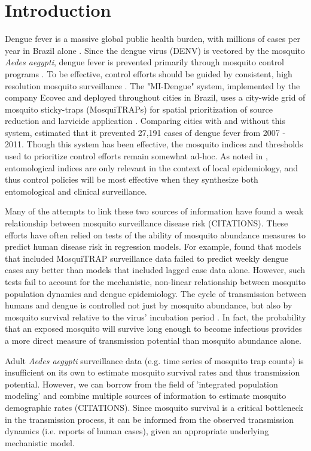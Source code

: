 \documentclass[10pt,letterpaper]{article}
\begin{document}
\linenumbers

\section*{Introduction}

Dengue fever is a massive global public health burden, with millions of cases per year in Brazil alone \cite{Bhatt2013}.  
Since the dengue virus (DENV) is vectored by the mosquito \textit{Aedes aegypti}, dengue fever is prevented primarily through mosquito control programs \cite{Achee2015}.
To be effective, control efforts should be guided by consistent, high resolution mosquito surveillance \cite{Morrison2008}.
The "MI-Dengue" system, implemented by the company Ecovec and deployed throughout cities in Brazil, uses a city-wide grid of mosquito sticky-traps (MosquiTRAPs) for spatial prioritization of source reduction and larvicide application \cite{Eiras2009}.
Comparing cities with and without this system, \cite{Pepin2013} estimated that it prevented 27,191 cases of dengue fever from 2007 - 2011.
Though this system has been effective, the mosquito indices and thresholds used to prioritize control efforts remain somewhat ad-hoc.
As noted in \cite{Morrison2008}, entomological indices are only relevant in the context of local epidemiology, and thus control policies will be most effective when they synthesize both entomological and clinical surveillance.

Many of the attempts to link these two sources of information have found a weak relationship between mosquito surveillance disease risk (CITATIONS).
These efforts have often relied on tests of the ability of mosquito abundance measures to predict human disease risk in regression models.
For example, \cite{Pepin2015} found that models that included MosquiTRAP surveillance data failed to predict weekly dengue cases any better than models that included lagged case data alone.
However, such tests fail to account for the mechanistic, non-linear relationship between mosquito population dynamics and dengue epidemiology.
The cycle of transmission between humans and dengue is controlled not just by mosquito abundance, but also by mosquito survival relative to the virus' incubation period \cite{Achee2015}.
In fact, the probability that an exposed mosquito will survive long enough to become infectious provides a more direct measure of transmission potential than mosquito abundance alone.

Adult \textit{Aedes aegypti} surveillance data (e.g. time series of mosquito trap counts) is insufficient on its own to estimate mosquito survival rates and thus transmission potential.
However, we can borrow from the field of 'integrated population modeling' and combine multiple sources of information to estimate mosquito demographic rates (CITATIONS).
Since mosquito survival is a critical bottleneck in the transmission process, it can be informed from the observed transmission dynamics (i.e. reports of human cases), given an appropriate underlying mechanistic model.
\end{document}
